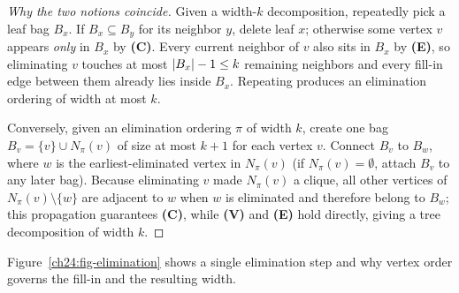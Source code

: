 \begin{proof}[Why the two notions coincide]
Given a width-$k$ decomposition, repeatedly pick a leaf bag $B_x$. If
$B_x\subseteq B_y$ for its neighbor $y$, delete leaf $x$; otherwise some vertex $v$
appears \emph{only} in $B_x$ by \textbf{(C)}. Every current neighbor of $v$ also
sits in $B_x$ by \textbf{(E)}, so eliminating $v$ touches at most
$\lvert B_x\rvert-1\le k$ remaining neighbors and every fill-in edge between them already
lies inside $B_x$. Repeating produces an elimination ordering of width at most $k$.

Conversely, given an elimination ordering $\pi$ of width $k$, create one bag
$B_v = \{v\}\cup N_\pi(v)$ of size at most $k+1$ for each vertex $v$. Connect $B_v$
to $B_w$, where $w$ is the earliest-eliminated vertex in $N_\pi(v)$ (if
$N_\pi(v)=\emptyset$, attach $B_v$ to any later bag). Because eliminating $v$ made
$N_\pi(v)$ a clique, all other vertices of $N_\pi(v)\setminus\{w\}$ are adjacent to
$w$ when $w$ is eliminated and therefore belong to $B_w$; this propagation
guarantees \textbf{(C)}, while \textbf{(V)} and \textbf{(E)} hold directly, giving
a tree decomposition of width $k$.
\end{proof}

Figure~\ref{ch24:fig-elimination} shows a single elimination step and why vertex
order governs the fill-in and the resulting width.

